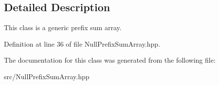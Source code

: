 \subsection{Detailed Description}
This class is a generic prefix sum array. 

Definition at line 36 of file Null\+Prefix\+Sum\+Array.\+hpp.



The documentation for this class was generated from the following file\+:\begin{DoxyCompactItemize}
\item 
src/Null\+Prefix\+Sum\+Array.\+hpp\end{DoxyCompactItemize}

